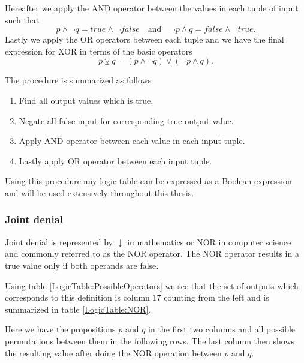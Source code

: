                 Hereafter we apply the AND operator between the values in each tuple of input such that
                \begin{equation}
                p \wedge \neg q = true \wedge \neg false \quad \text{and} \quad \neg p \wedge q = false \wedge \neg true.
                \end{equation}
                Lastly we apply the OR operators between each tuple and we have the final expression for XOR in terms of the basic operators
                \begin{equation}
                p \veebar q = (p \wedge \neg q) \vee (\neg p \wedge q).
                \end{equation}
                
                The procedure is summarized as follows
                \begin{enumerate}
                    \item Find all output values which is true.
                    \item Negate all false input for corresponding true output value.
                    \item Apply AND operator between each value in each input tuple.
                    \item Lastly apply OR operator between each input tuple.
                \end{enumerate}
                Using this procedure any logic table can be expressed as a Boolean expression and will be used extensively throughout this thesis.
                
            \subsubsection{Joint denial}
                Joint denial is represented by $\downarrow$ in mathematics or NOR in computer science and commonly referred to as the NOR operator. The NOR operator results in a true value only if both operands are false.
                
                Using table \ref{LogicTable:PossibleOperators} we see that the set of outputs which corresponds to this definition is column 17 counting from the left and is summarized in table \ref{LogicTable:NOR}.
                
                Here we have the propositions $p$ and $q$ in the first two columns and all possible permutations between them in the following rows. The last column then shows the resulting value after doing the NOR operation between $p$ and $q$.
                
